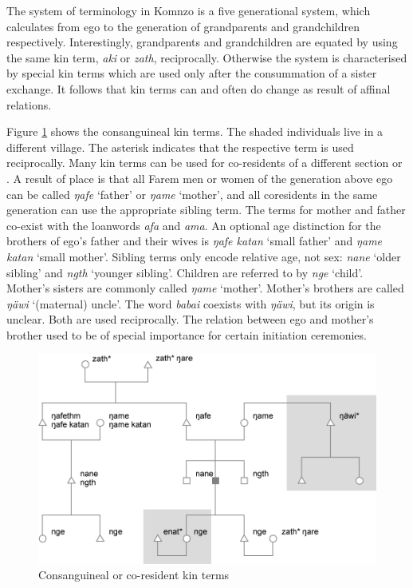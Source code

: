 The system of  terminology in Komnzo is a five generational system, which calculates from ego to the generation of grandparents and grandchildren respectively. Interestingly, grandparents and grandchildren are equated by using the same kin term, \emph{aki} or \emph{zath}, reciprocally. Otherwise the system is characterised by special kin terms which are used only after the consummation of a sister exchange. It follows that kin terms can and often do change as result of affinal relations.

Figure \ref{fig:kinship1} shows the consanguineal kin terms. The shaded individuals live in a different village. The asterisk indicates that the respective term is used reciprocally. Many kin terms can be used for co-residents of a different section or . A result of place  is that all Farem men or women of the generation above ego can be called \emph{ŋafe} `father' or \emph{ŋame} `mother', and all coresidents in the same generation can use the appropriate sibling term. The terms for mother and father co-exist with the  loanwords \emph{afa} and \emph{ama}. An optional age distinction for the brothers of ego's father and their wives is \emph{ŋafe katan} `small father' and \emph{ŋame katan} `small mother'. Sibling terms only encode relative age, not sex: \emph{nane} `older sibling' and \emph{ngth} `younger sibling'. Children are referred to by \emph{nge} `child'. Mother's sisters are commonly called \emph{ŋame} `mother'. Mother's brothers are called \emph{ŋäwi} `(maternal) uncle'. The word \emph{babai} coexists with \emph{ŋäwi}, but its origin is unclear. Both are used reciprocally. The relation between ego and mother's brother used to be of special importance for certain initiation ceremonies.

\begin{figure}
	\includegraphics[width=12cm]{figures/kinship1.png}
	\caption[Consanguineal or co-resident kin terms]{Consanguineal or co-resident kin terms}
	\label{fig:kinship1}
\end{figure}%

